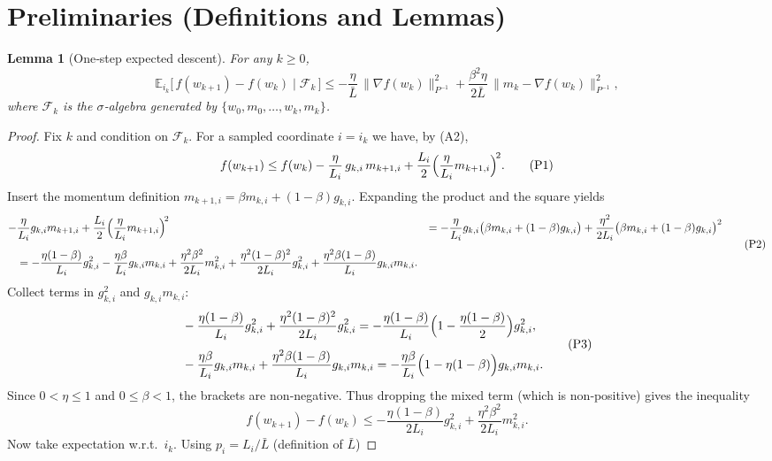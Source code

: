 \documentclass{article}
\newtheorem{lemma}{Lemma}
\newcommand{\E}{\mathbb{E}}
\begin{document}
\section*{Preliminaries (Definitions and Lemmas)}
\begin{lemma}[One‑step expected descent]\label{lem:descent}
For any $k\ge0$,
\[
\E_{i_k}\!\bigl[\,f(w_{k+1})-f(w_k)\mid \mathcal{F}_k\,\bigr]
\le -\frac{\eta}{\bar L}\,
\bigl\|\nabla f(w_k)\bigr\|_{P^{-1}}^{2}
+ \frac{\beta^2\eta}{2\bar L}\,
\|m_{k}-\nabla f(w_k)\|_{P^{-1}}^{2},
\tag{L1}
\]
where $\mathcal{F}_k$ is the $\sigma$‑algebra generated by
$\{w_0,m_0,\dots,w_k,m_k\}$.
\end{lemma}
\begin{proof}
Fix $k$ and condition on $\mathcal{F}_k$.  
For a sampled coordinate $i=i_k$ we have, by (A2),
\[
f(w_{k+1})\le f(w_k)-\frac{\eta}{L_i} \,g_{k,i}\,m_{k+1,i}
+\frac{L_i}{2}\Bigl(\frac{\eta}{L_i} m_{k+1,i}\Bigr)^{\!2}.
\tag{P1}
\]
Insert the momentum definition $m_{k+1,i}= \beta m_{k,i}+(1-\beta)g_{k,i}$.
Expanding the product and the square yields
\[
\begin{aligned}
-&\frac{\eta}{L_i} g_{k,i} m_{k+1,i}
+\frac{L_i}{2}\Bigl(\frac{\eta}{L_i} m_{k+1,i}\Bigr)^{\!2}
&= -\frac{\eta}{L_i} g_{k,i}\bigl(\beta m_{k,i}+(1-\beta)g_{k,i}\bigr)
   +\frac{\eta^{2}}{2L_i} \bigl(\beta m_{k,i}+(1-\beta)g_{k,i}\bigr)^{2}\\[4pt]
&= -\frac{\eta(1-\beta)}{L_i} g_{k,i}^{2}
   -\frac{\eta\beta}{L_i} g_{k,i}m_{k,i}
   +\frac{\eta^{2}\beta^{2}}{2L_i} m_{k,i}^{2}
   +\frac{\eta^{2}(1-\beta)^{2}}{2L_i} g_{k,i}^{2}
   +\frac{\eta^{2}\beta(1-\beta)}{L_i} g_{k,i} m_{k,i}.
\end{aligned}
\tag{P2}
\]
Collect terms in $g_{k,i}^{2}$ and $g_{k,i}m_{k,i}$:
\[
\begin{aligned}
&-\frac{\eta(1-\beta)}{L_i} g_{k,i}^{2}
   +\frac{\eta^{2}(1-\beta)^{2}}{2L_i} g_{k,i}^{2}
   = -\frac{\eta(1-\beta)}{L_i}
      \Bigl(1-\frac{\eta(1-\beta)}{2}\Bigr) g_{k,i}^{2},\\[4pt]
&-\frac{\eta\beta}{L_i} g_{k,i}m_{k,i}
   +\frac{\eta^{2}\beta(1-\beta)}{L_i} g_{k,i} m_{k,i}
   = -\frac{\eta\beta}{L_i}
      \Bigl(1-\eta(1-\beta)\Bigr) g_{k,i} m_{k,i}.
\end{aligned}
\tag{P3}
\]
Since $0<\eta\le1$ and $0\le\beta<1$, the brackets are non‑negative.
Thus dropping the mixed term (which is non‑positive) gives the inequality
\[
f(w_{k+1})-f(w_k)
\le -\frac{\eta(1-\beta)}{2L_i} g_{k,i}^{2}
   +\frac{\eta^{2}\beta^{2}}{2L_i} m_{k,i}^{2}.
\tag{P4}
\]
Now take expectation w.r.t.\ $i_k$.  Using $p_i=L_i/\bar L$ (definition of $\bar L$)

\end{proof}
\end{document}
